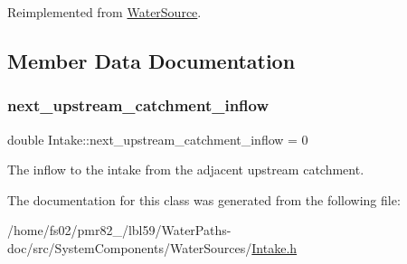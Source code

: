 Reimplemented from \mbox{\hyperlink{classWaterSource_a634904c510b16de6d7c057fed6d6e625}{Water\+Source}}.



\subsection{Member Data Documentation}
\mbox{\label{classIntake_a5d28f8899e9d4d61983ad8fdf7d58373}} 
\subsubsection{\texorpdfstring{next\+\_\+upstream\+\_\+catchment\+\_\+inflow}{next\_upstream\_catchment\_inflow}}
{\footnotesize\ttfamily double Intake\+::next\+\_\+upstream\+\_\+catchment\+\_\+inflow = 0}



The inflow to the intake from the adjacent upstream catchment. 



The documentation for this class was generated from the following file\+:\begin{DoxyCompactItemize}
\item 
/home/fs02/pmr82\+\_/lbl59/\+Water\+Paths-\/doc/src/\+System\+Components/\+Water\+Sources/\mbox{\hyperlink{Intake_8h}{Intake.\+h}}\end{DoxyCompactItemize}
